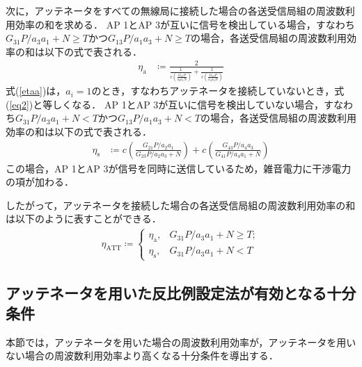 \documentclass[master]{kuisthesis}		%
\begin{document}
次に，アッテネータをすべての無線局に接続した場合の各送受信局組の周波数利用効率の和を求める．
AP 1とAP 3が互いに信号を検出している場合，すなわち$G_{31} P /a_3 a_1 + N \geq T$かつ$G_{13} P/a_1 a_3  + N \geq T$の場合，各送受信局組の周波数利用効率の和は以下の式で表される．
\begin{align}
\eta_\mathrm{a} &\coloneqq
\displaystyle \frac {\displaystyle 2 }
{\displaystyle \frac{1}{\displaystyle c\left(\frac{G_{21} P}{a_2a_1N}\right)} + \frac{1}{\displaystyle c\left(\frac{G_{43} P}{a_4a_3N}\right)}}\label{etaa}
\end{align}
式(\ref{etaa})は，$a_i=1$のとき，すなわちアッテネータを接続していないとき，式(\ref{eq2})と等しくなる．
AP 1とAP 3が互いに信号を検出していない場合，すなわち$G_{31} P/a_3 a_1 + N < T$かつ$G_{13} P/a_1 a_3 + N < T$の場合，各送受信局組の周波数利用効率の和は以下の式で表される．
\begin{align}
 \eta_\mathrm{s} &\coloneqq c\left(\frac{G_{21} P/a_2 a_1}{G_{23} P/a_2a_3 + N}\right) + c\left(\frac{G_{43} P/a_4 a_3 }{G_{41} P/a_4 a_1 + N}\right)\label{etas}
\end{align}
この場合，AP 1とAP 3が信号を同時に送信しているため，雑音電力に干渉電力の項が加わる．

したがって，アッテネータを接続した場合の各送受信局組の周波数利用効率の和は以下のように表すことができる．
\begin{align}\label{etaATT}
\eta_\mathrm{ATT} \coloneqq \begin{cases}
\eta_\mathrm{a}, & G_{31} P/a_3 a_1 + N \geq T; \\ 
\eta_\mathrm{s}, & G_{31} P/a_3 a_1 + N < T
\end{cases} 
\end{align}

\subsection{アッテネータを用いた反比例設定法が有効となる十分条件} \label{suff}
本節では，アッテネータを用いた場合の周波数利用効率が，アッテネータを用いない場合の周波数利用効率より高くなる十分条件を導出する．
\end{document}
